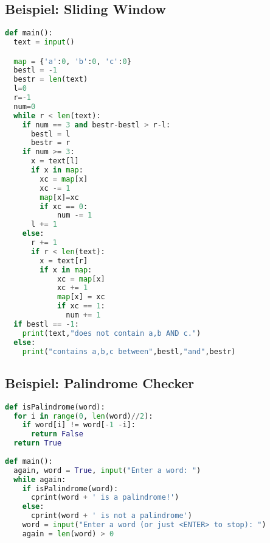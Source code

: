 \begin{sectionbox}
\subsection{Beispiel: Sliding Window}
\begin{lstlisting}[language=Python]
def main():
  text = input()

  map = {'a':0, 'b':0, 'c':0}
  bestl = -1
  bestr = len(text)
  l=0
  r=-1
  num=0
  while r < len(text):
    if num == 3 and bestr-bestl > r-l:
      bestl = l
      bestr = r
    if num >= 3:
      x = text[l]
      if x in map:
        xc = map[x]
        xc -= 1
        map[x]=xc
        if xc == 0:
            num -= 1
      l += 1
    else:
      r += 1
      if r < len(text):
        x = text[r]
        if x in map:
            xc = map[x]
            xc += 1
            map[x] = xc
            if xc == 1:
              num += 1
  if bestl == -1:
    print(text,"does not contain a,b AND c.")
  else:
    print("contains a,b,c between",bestl,"and",bestr)
\end{lstlisting}
\end{sectionbox}

\begin{sectionbox}
\subsection{Beispiel: Palindrome Checker}
\begin{lstlisting}[language=Python]
def isPalindrome(word):
  for i in range(0, len(word)//2):
    if word[i] != word[-1 -i]:
      return False
  return True
    
def main():
  again, word = True, input("Enter a word: ")
  while again:
    if isPalindrome(word):
      cprint(word + ' is a palindrome!')
    else:
      cprint(word + ' is not a palindrome')
    word = input("Enter a word (or just <ENTER> to stop): ")
    again = len(word) > 0
\end{lstlisting}\vspace{-6px}
\end{sectionbox}